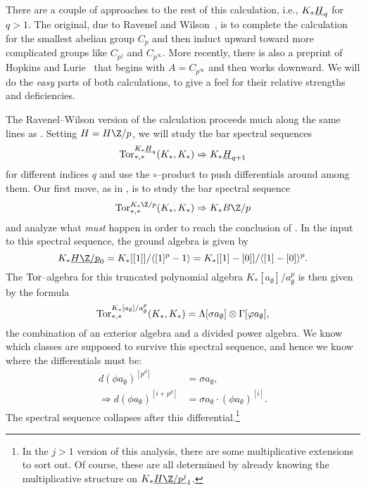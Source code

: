 There are a couple of approaches to the rest of this calculation, i.e., $K_* \underline{\smash{H}}_{q}$ for $q > 1$.  The original, due to Ravenel and Wilson~\cite{RavenelWilsonKthyOfEMSpaces}, is to complete the calculation for the smallest abelian group $C_p$ and then induct upward toward more complicated groups like $C_{p^j}$ and $C_{p^\infty}$.  More recently, there is also a preprint of Hopkins and Lurie~\cite{HopkinsLurie} that begins with $A = C_{p^\infty}$ and then works downward.  We will do the \emph{easy} parts of both calculations, to give a feel for their relative strengths and deficiencies.

The Ravenel--Wilson version of the calculation proceeds much along the same lines as .  Setting $H = H\Z/p$, we will study the bar spectral sequences \[\operatorname{Tor}^{K_* \underline{\smash{H}}_{q}}_{*, *}(K_*, K_*) \Rightarrow K_* \underline{\smash{H}}_{q+1}\] for different indices $q$ and use the $\circ$--product to push differentials around among them.  Our first move, as in , is to study the bar spectral sequence \[\Tor^{K_* \Z/p}_{*, *}(K_*, K_*) \Rightarrow K_* B\Z/p\] and analyze what \emph{must} happen in order to reach the conclusion of .  In the input to this spectral sequence, the ground algebra is given by \[K_* \OS{H\Z/p}{0} = K_*[[1]] / \<[1]^{p} - 1\> = K_*[[1] - [0]] / \<[1] - [0]\>^{p}.\]  The $\operatorname{Tor}$--algebra for this truncated polynomial algebra $K_*[a_\emptyset] / a_\emptyset^{p}$ is then given by the formula \[\operatorname{Tor}^{K_*[a_\emptyset] / a_\emptyset^{p}}_{*, *}(K_*, K_*) = \Lambda[\sigma a_\emptyset] \otimes \Gamma[\varphi a_\emptyset],\] the combination of an exterior algebra and a divided power algebra.  We know which classes are supposed to survive this spectral sequence, and hence we know where the differentials must be:
\begin{align*}
d(\phi a_\emptyset)^{[p^d]} & = \sigma a_\emptyset, \\
\Rightarrow d(\phi a_\emptyset)^{[i + p^d]} & = \sigma a_\emptyset \cdot (\phi a_\emptyset)^{[i]}.
\end{align*}
The spectral sequence collapses after this differential.\footnote{In the $j > 1$ version of this analysis, there are some multiplicative extensions to sort out.  Of course, these are all determined by already knowing the multiplicative structure on $K_* \OS{H\Z/p^j}{1}$.}


